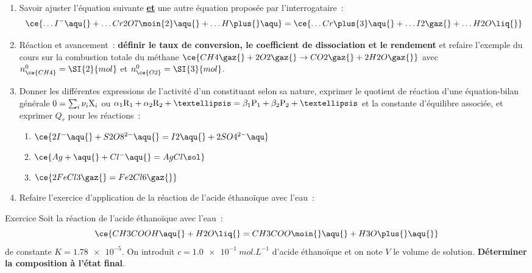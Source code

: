 \documentclass[a4paper, 12pt, final, garamond]{book}
\begin{document}
\begin{enumerate}[resume]
    \item Savoir ajuster l'équation suivante \textbf{\underline{et}} une autre
        équation proposée par l'interrogataire~:
        \begin{gather*}
            \ce{\ldots I^-\aqu{} + \ldots Cr2O7\moin{2}\aqu{} + \ldots H\plus{}\aqu}
            =
            \ce{\ldots Cr\plus{3}\aqu{} + \ldots I2\gaz{} + \ldots H2O\liq{}}
        \end{gather*}

    \item Réaction et avancement~: \textbf{définir le taux de conversion,
        le coefficient de dissociation et le rendement} et refaire l'exemple du
        cours sur la combustion totale du méthane $\ce{CH4\gaz{} + 2O2\gaz{}
        \rightarrow CO2\gaz{} + 2H2O\gaz{}}$ avec $n_{\ce{CH4}}^0 = \SI{2}{mol}$
        et $n_{\ce{O2}}^0 = \SI{3}{mol}$.

    \item Donner les différentes expressions de l'activité d'un constituant
        selon sa nature, exprimer le quotient de réaction d'une équation-bilan
        générale $0=\sum_i \nu_i{\rm X}_i$ ou $\alpha_1{\rm R}_1 + \alpha_2{\rm
        R}_2 + … = \beta_1{\rm P}_1 + \beta_2{\rm P}_2 + …$ et la constante
        d'équilibre associée, et exprimer $Q_r$ pour les réactions~:
        \begin{enumerate}
            \item $\ce{2I^-\aqu{} + S2O8^{2-}\aqu{} = I2\aqu{} +2SO4^{2-}\aqu}$
            \item $\ce{Ag+\aqu{} + Cl^-\aqu{} = AgCl\sol}$
            \item $\ce{2FeCl3\gaz{} = Fe2Cl6\gaz{}}$
        \end{enumerate}
    \item Refaire l'exercice d'application de la réaction de l'acide éthanoïque
        avec l'eau~:
\end{enumerate}
\begin{NCexem}[width=\linewidth, breakable]{Exercice}
    Soit la réaction de l'acide éthanoïque avec l'eau~:
    \[\ce{CH3COOH\aqu{} + H2O\liq{} = CH3COO\moin{}\aqu{} + H3O\plus{}\aqu{}}\]
    de constante $K = \num{1.78e-5}$. On introduit $c = \SI{1.0e-1}{mol.L^{-1}}$
    d'acide éthanoïque et on note $V$ le volume de solution. \textbf{Déterminer
    la composition à l'état final}.
\end{NCexem}
\end{document}
